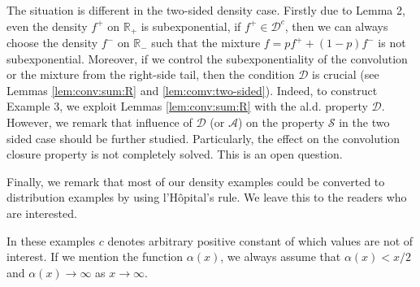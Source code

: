 \documentclass[12pt,leqno]{amsart}
\newcommand{\R}{\mathbb{R}}
\newcommand{\cals}{{\mathcal S}}
\newcommand{\cala}{{\mathcal A}}
\newcommand{\cald}{{\mathcal D}}
\newcommand{\1}{{\mathbf 1}}
\begin{document}
The situation is different in the two-sided density case. 
Firstly due to Lemma 2, even the density $f^+$ on $\R_+$ is subexponential, if $f^+\in \cald^c$, then
we can always choose the density $f^-$ on $\R_-$ %
such that the mixture $f=pf^{+}+(1-p)f^-$ is not subexponential.
Moreover, if we control the subexponentiality of the convolution or the mixture  
from the right-side tail, then 
the condition $\cald$ is crucial (see Lemmas \ref{lem:conv:sum:R} and \ref{lem:comv:two-sided}). Indeed, to construct 
 Example 3, we exploit Lemmas \ref{lem:conv:sum:R} with the al.d. property $\cald$. 
However, we remark that influence of $\cald$ (or $\cala$) on the property $\cals$ in the two sided case should be 
further studied. Particularly, the effect on the convolution closure property is not completely solved. 
This is an open question.   


Finally, we remark that most of our density examples could be converted to distribution examples 
by using l'H\^opital's rule. We leave this to the readers who are interested.


In these examples $c$ denotes arbitrary positive constant of which values are not of interest. If we mention the function $\alpha(x)$, 
we always assume that $\alpha(x)<x/2$ and $\alpha(x)\to\infty$ as $x\to\infty$. 
\\
\end{document}
